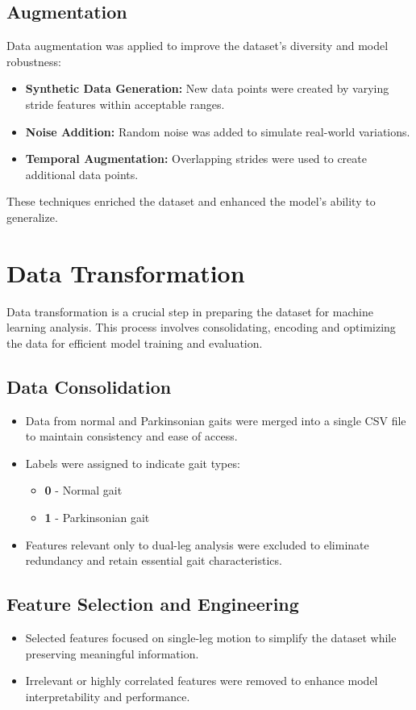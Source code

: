 \subsection{Augmentation}

Data augmentation was applied to improve the dataset's diversity and model robustness:
\begin{itemize}
	\item \textbf{Synthetic Data Generation:} New data points were created by varying stride features within acceptable ranges.
	\item \textbf{Noise Addition:} Random noise was added to simulate real-world variations.
	\item \textbf{Temporal Augmentation:} Overlapping strides were used to create additional data points.
\end{itemize}

These techniques enriched the dataset and enhanced the model’s ability to generalize.

\section{Data Transformation}

Data transformation is a crucial step in preparing the dataset for machine learning analysis. This process involves consolidating, encoding and optimizing the data for efficient model training and evaluation.

\subsection{Data Consolidation}
\begin{itemize}
	\item Data from normal and Parkinsonian gaits were merged into a single CSV file to maintain consistency and ease of access.
	\item Labels were assigned to indicate gait types:
	\begin{itemize}
		\item \textbf{0} - Normal gait
		\item \textbf{1} - Parkinsonian gait
	\end{itemize}
	\item Features relevant only to dual-leg analysis were excluded to eliminate redundancy and retain essential gait characteristics.
\end{itemize}

\subsection{Feature Selection and Engineering}
\begin{itemize}
	\item Selected features focused on single-leg motion to simplify the dataset while preserving meaningful information.
	\item Irrelevant or highly correlated features were removed to enhance model interpretability and performance.
\end{itemize}

